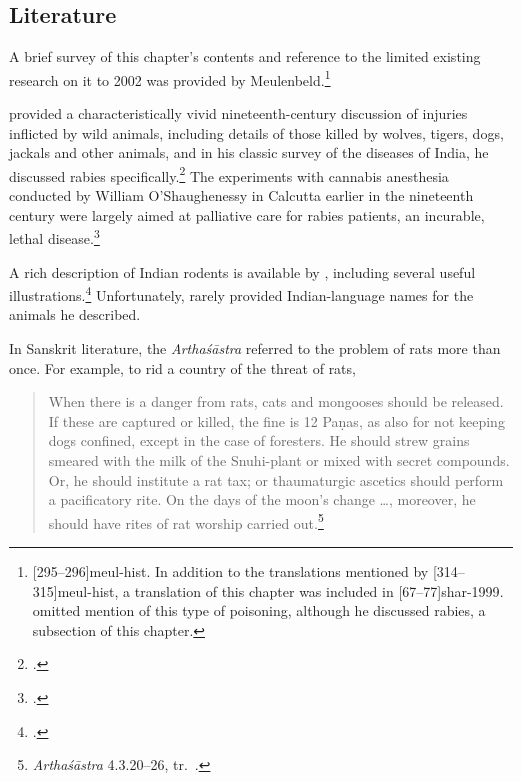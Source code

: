 \subsection{Literature}

A brief survey of this chapter's contents and reference to the
limited existing research on it to 2002 was provided by
Meulenbeld.\footnote{[295--296]{meul-hist}. In addition
    to the translations mentioned by [314--315]{meul-hist},
    a translation of this chapter was included in
    [67--77]{shar-1999}. \citet{sekh-2023} omitted mention of
    this type of poisoning, although he discussed rabies, a subsection of
    this chapter.}
    

 \citeauthor{chev-1870} provided a characteristically vivid
nineteenth-century discussion of injuries inflicted by wild animals,
including details of those killed by wolves, tigers, dogs, jackals
and other animals, and in his classic survey of the diseases of
India, he discussed rabies
specifically.\footcites[359--368]{chev-1870} [426--440]{chev-1886}
The experiments with cannabis anesthesia conducted by William
O'Shaughenessy in Calcutta earlier in the nineteenth century were
largely aimed at palliative care for rabies
patients, an incurable, lethal disease.\footcite[50--55]{wuja-cann}


A rich description of Indian rodents is available by \citeauthor{bia},
including several useful illustrations.\footcite[ch.\,13,
esp.\,205--215]{bia} Unfortunately, \citeauthor{bia} rarely provided 
Indian-language names for the animals he described.

In Sanskrit literature, the \emph{Arthaśāstra} referred to the problem of rats 
more than once.  For example, to rid a country of the threat of rats, 
\begin{quote}    
    When there is a danger from rats, cats and mongooses should be
released. If these are captured or killed, the fine is 12 Paṇas,
as also for not keeping dogs confined, except in the case of
foresters. He should strew grains smeared with the milk of the
Snuhi-plant or mixed with secret compounds. Or, he should
institute a rat tax; or thaumaturgic ascetics should perform a
pacificatory rite. On the days of the moon’s change \ldots,
moreover, he should have rites of rat worship carried
out.\footnote{\emph{Arthaśāstra} 4.3.20--26, tr.\ \cite[230]{oliv-2013}.}
\end{quote}




\newpage

